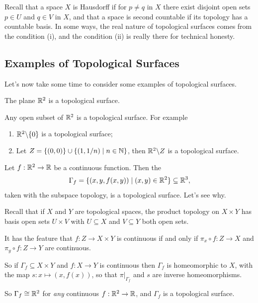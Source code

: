 \documentclass[a4paper]{scrartcl}
\begin{document}
Recall that a space $X$ is Hausdorff if for $p \neq q$ in $X$ there exist disjoint open sets $p \in U$ and $q \in V$ in $X$, and that a space is second countable if its topology has a countable basis.
In some ways, the real nature of topological surfaces comes from the condition (i), and the condition (ii) is really there for technical honesty.

\subsection{Examples of Topological Surfaces}

Let's now take some time to consider some examples of topological surfaces.

\begin{example}[$\R^2$]
    The plane $\R^2$ is a topological surface.
\end{example}

\begin{example}[Subsets of $\R^2$]
    Any open subset of $\R^2$ is a topological surface. For example
    \begin{enumerate}[label=(\roman*)]
        \item $\mathbb{R}^2 \backslash \{0\}$ is a topological surface;
        \item Let $Z = \{(0, 0) \} \cup \{(1, 1/n) \mid n \in \mathbb{N}\}$, then $\mathbb{R}^2 \backslash Z$ is a topological surface.
    \end{enumerate}
\end{example}

\begin{example}[Graphs]
    Let $f: \mathbb{R}^2 \rightarrow \mathbb{R}$ be a continuous function. Then the  
    $$\Gamma_f = \{(x, y, f(x, y)) \mid (x, y) \in \mathbb{R}^2\} \subseteq \mathbb{R}^3,$$
    taken with the subspace topology, is a topological surface. Let's see why.
    
    Recall that if $X$ and $Y$ are topological spaces, the product topology on $X \times Y$ has basis open sets $U \times V$ with $U \subseteq X$ and $V \subseteq Y$ both open sets.

    It has the feature that $f: Z \rightarrow X \times Y$ is continuous if and only if $\pi_x \circ f: Z \rightarrow X$ and $\pi_y \circ f: Z \rightarrow Y$ are continuous.

    So if $\Gamma_f \subseteq X \times Y$ and $f: X \rightarrow Y$ is continuous then $\Gamma_f$ is homeomorphic to $X$, with the map $s: x \mapsto (x, f(x))$, so that $\left.\pi\right|_{\Gamma_f}$ and $s$ are inverse homeomorphisms.

    So $\Gamma_f \cong \mathbb{R}^2$ for \emph{any} continuous $f: \mathbb{R}^2 \rightarrow \mathbb{R}$, and $\Gamma_f$ is a topological surface.
\end{example}
\end{document}
